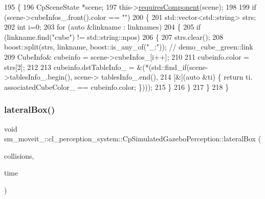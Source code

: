 \begin{DoxyCode}
195             \{
196                 CpSceneState *scene;
197                 this->\hyperlink{classsmacc_1_1ISmaccComponent_aa06d58b1dcec3c513ca2edddfd3847ec}{requiresComponent}(scene);
198 
199                 \textcolor{keywordflow}{if} (scene->cubeInfos\_.front().color == \textcolor{stringliteral}{""})
200                 \{
201                     std::vector<std::string> strs;
202                     \textcolor{keywordtype}{int} i=0;
203                     \textcolor{keywordflow}{for} (\textcolor{keyword}{auto} &linkname : linknames)
204                     \{
205                         \textcolor{keywordflow}{if} (linkname.find(\textcolor{stringliteral}{"cube"}) != std::string::npos)
206                         \{
207                             strs.clear();
208                             boost::split(strs, linkname, boost::is\_any\_of(\textcolor{stringliteral}{"\_:"})); \textcolor{comment}{// demo\_cube\_green::link}
209                             CubeInfo& cubeinfo = scene->cubeInfos\_[i++];
210 
211                             cubeinfo.color = strs[2];
212 
213                             cubeinfo.dstTableInfo\_ = &(*(std::find\_if(scene->tablesInfo\_.begin(), scene->
      tablesInfo\_.end(),
214                                                                       [&](\textcolor{keyword}{auto} &ti) \{ \textcolor{keywordflow}{return} ti.
      associatedCubeColor\_ == cubeinfo.color; \})));
215                         \}
216                     \}
217                 \}
218             \}
\end{DoxyCode}
\mbox{\label{classsm__moveit__4_1_1cl__perception__system_1_1CpSimulatedGazeboPerception_adf4810736ecdd01ba42fc86ea337e5e1}} 
\subsubsection{\texorpdfstring{lateral\+Box()}{lateralBox()}}
{\footnotesize\ttfamily void sm\+\_\+moveit\+\_\+::cl\+\_\+perception\+\_\+system\+::\+Cp\+Simulated\+Gazebo\+Perception\+::lateral\+Box (\begin{DoxyParamCaption}\item[{std\+::vector$<$ moveit\+\_\+msgs\+::\+Collision\+Object $>$ \&}]{collisions,  }\item[{ros\+::\+Time}]{time }\end{DoxyParamCaption})\hspace{0.3cm}{\ttfamily [inline]}}




